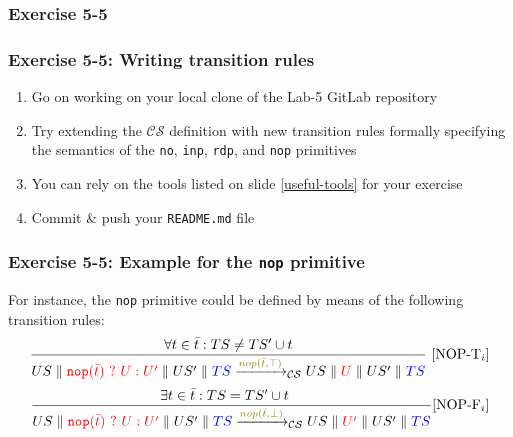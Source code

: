 \documentclass[handout]{beamer}\mode<presentation>{\usetheme{AMSCesenaBleu}}
\begin{document}
\subsubsection{Exercise 5-5}

\begin{frame}
\frametitle{Exercise 5-5: Writing transition rules}

    \begin{enumerate}
    \item Go on working on your local clone of the Lab-5 GitLab repository
        
        \vfill
        
        \item Try extending the $\mathcal{CS}$ definition with new transition rules formally specifying the semantics of the \texttt{no}, \texttt{inp}, \texttt{rdp}, and \texttt{nop} primitives 
        
        \vfill
        
        \item You can rely on the tools listed on slide \ref{useful-tools} for your exercise
        
        \vfill
        
        \item Commit \& push your \texttt{README.md} file
        
    \end{enumerate}

\end{frame}

\begin{frame}
\frametitle{Exercise 5-5: Example for the \texttt{nop} primitive}

    For instance, the \texttt{nop} primitive could be defined by means of the following transition rules:
    \[
		\frac{
			\forall t \in \bar{t} : TS \neq TS' \cup t
		}{
			US \parallel \highlightR{\mathtt{nop}(\bar t)\ ?\ U : U'} \parallel US' \parallel \highlightB{TS}
			\xrightarrow{\highlightG{nop(\bar t, \top)}}_\mathcal{CS}
			US \parallel \highlightR{U} \parallel US' \parallel \highlightB{TS}
		} 
		~[\text{NOP-T}_i]
	\]
    \[
		\frac{
			\exists t \in \bar{t} : TS = TS' \cup t \quad 
		}{
			US \parallel \highlightR{\mathtt{nop}(\bar t)\ ?\ U : U'} \parallel US' \parallel \highlightB{TS}
			\xrightarrow{\highlightG{nop(\bar t, \bot)}}_\mathcal{CS}
			US \parallel \highlightR{U'} \parallel US' \parallel \highlightB{TS}
		} 
		[\text{NOP-F}_i]
	\]

\end{frame}
\end{document}
